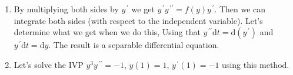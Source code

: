 \documentclass{ximera}
\begin{document}
 \begin{enumerate}
    \item  By multiplying both sides by $y^{\,\prime}$ we get  $y^{\,\prime}y^{\,\prime\prime}=f(y)y^{\,\prime}$.  Then we can integrate both sides (with respect to the independent variable).  Let's determine what we get when we do this, Using that $y^{\,\prime\prime} \mathrm{d}t=\mathrm{d}(y^{\,\prime})$ and $y^{\,\prime} \mathrm{d}t=\mathrm{d}y$.  The result is a separable differential equation.


    \vfill
    

    \item Let's  solve  the IVP $y^3y^{\,\prime\prime}=-1$, $y(1)=1$, $y^{\,\prime}(1)=-1$ using this method.


    
\vfill
\vfill
\vfill

     
 \end{enumerate}
\end{document}
